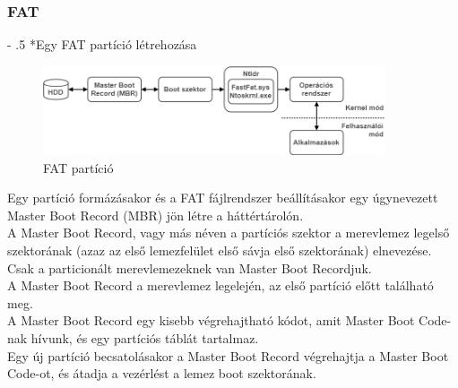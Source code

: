 \documentclass[tikz,12pt,margin=0px]{article}
\makeatletter
\renewcommand\paragraph{%
	\@startsection{paragraph}{4}{0mm}%
	{-\baselineskip}%
	{.5\baselineskip}%
	{\normalfont\normalsize\bfseries}}
\makeatother
\begin{document}
	\subsubsection*{FAT}

    \paragraph*{Egy FAT partíció létrehozása}

	\begin{figure}[H]
		\centering
		\includegraphics[width=0.9\textwidth]{img/FAT_disk.png}
		\caption{FAT partíció}
        \label{fat_partition}
	\end{figure}

    \noindent Egy partíció formázásakor és a FAT fájlrendszer beállításakor egy úgynevezett Master Boot Record (MBR) jön létre a háttértárolón.\\

    \noindent A Master Boot Record, vagy más néven a partíciós szektor a merevlemez legelső szektorának (azaz az első lemezfelület első sávja első szektorának) elnevezése. \\

    \noindent Csak a particionált merevlemezeknek van Master Boot Recordjuk. \\

    \noindent A Master Boot Record a merevlemez legelején, az első partíció előtt található meg.\\

    \noindent A Master Boot Record egy kisebb végrehajtható kódot, amit Master Boot Code-nak hívunk, és egy partíciós táblát tartalmaz. \\

    \noindent Egy új partíció becsatolásakor a Master Boot Record végrehajtja a Master Boot Code-ot, és átadja a vezérlést a lemez boot szektorának.\\
\end{document}
